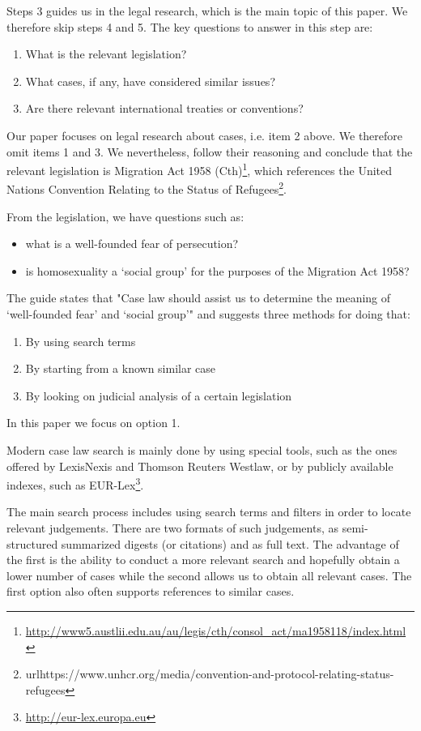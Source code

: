 Steps 3 guides us in the legal research, which is the main topic of this paper. We therefore skip steps 4 and 5. The key questions to answer in this step are:

\begin{enumerate}
\item What is the relevant legislation? 
\item What cases, if any, have considered similar issues? 
\item Are there relevant international treaties or conventions?
\end{enumerate}

Our paper focuses on legal research about cases, i.e. item 2 above. We therefore omit items 1 and 3. We nevertheless, follow their reasoning and conclude that the relevant legislation is Migration Act 1958 (Cth)\footnote{\url{http://www5.austlii.edu.au/au/legis/cth/consol_act/ma1958118/index.html}}, which references the United Nations Convention Relating to the Status of Refugees\footnote{url{https://www.unhcr.org/media/convention-and-protocol-relating-status-refugees}}.

From the legislation, we have questions such as:
\begin{itemize}
\item what is a well-founded fear of persecution?
\item is homosexuality a ‘social group’ for the purposes of the Migration Act 1958?
\end{itemize}

The guide states that "Case law should assist us to determine the meaning of ‘well-founded fear’ and ‘social group’" \cite{sanderson2021practical} and suggests three methods for doing that:

\begin{enumerate}
    \item By using search terms 
\item By starting from a known similar case
\item By looking on judicial analysis of a certain legislation
\end{enumerate}

In this paper we focus on option 1.

Modern case law search is mainly done by using special tools, such as the ones offered by LexisNexis and Thomson Reuters Westlaw, or by publicly available indexes, such as EUR-Lex\footnote{\url{http://eur-lex.europa.eu}}.

The main search process includes using search terms and filters in order to locate relevant judgements. There are two formats of such judgements, as semi-structured summarized digests (or citations) and as full text. The advantage of the first is the ability to conduct a more relevant search and hopefully obtain a lower number of cases while the second allows us to obtain all relevant cases. The first option also often supports references to similar cases.

